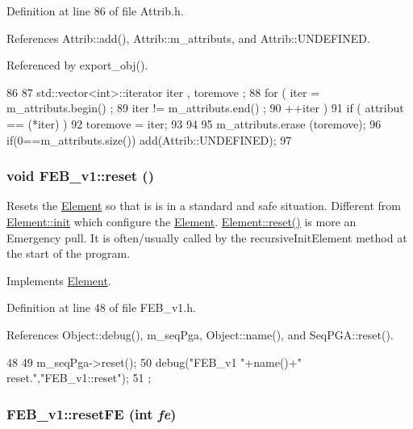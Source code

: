 Definition at line 86 of file Attrib.h.

References Attrib::add(), Attrib::m\_\-attributs, and Attrib::UNDEFINED.

Referenced by export\_\-obj().


\begin{DoxyCode}
86                                {
87     std::vector<int>::iterator iter , toremove ;
88     for ( iter  = m_attributs.begin() ;
89           iter != m_attributs.end()   ;
90           ++iter ) {
91       if ( attribut == (*iter) ) {
92         toremove = iter;
93       }
94     }
95     m_attributs.erase (toremove);
96     if(0==m_attributs.size()) add(Attrib::UNDEFINED);
97   }
\end{DoxyCode}
\hypertarget{classFEB__v1_a4e147b894ecbf4b05b92d01270d7ff13}{
\subsubsection[{reset}]{\setlength{\rightskip}{0pt plus 5cm}void FEB\_\-v1::reset ()}}
\label{classFEB__v1_a4e147b894ecbf4b05b92d01270d7ff13}
Resets the \hyperlink{classElement}{Element} so that is is in a standard and safe situation. Different from \hyperlink{classElement_af42754b5cabc198869222725218d695c}{Element::init} which configure the \hyperlink{classElement}{Element}. \hyperlink{classElement_a69efffa22f06909d768149715565cb56}{Element::reset()} is more an Emergency pull. It is often/usually called by the recursiveInitElement method at the start of the program. 

Implements \hyperlink{classElement_a69efffa22f06909d768149715565cb56}{Element}.

Definition at line 48 of file FEB\_\-v1.h.

References Object::debug(), m\_\-seqPga, Object::name(), and SeqPGA::reset().


\begin{DoxyCode}
48                {
49     m_seqPga->reset();
50     debug("FEB_v1 "+name()+" reset.","FEB_v1::reset");
51   };
\end{DoxyCode}
\hypertarget{classFEB__v1_ae351e55f3d8e8f936c324ffbda6816bf}{
\subsubsection[{resetFE}]{ FEB\_\-v1::resetFE (int {\em fe})}}
\label{classFEB__v1_ae351e55f3d8e8f936c324ffbda6816bf}



